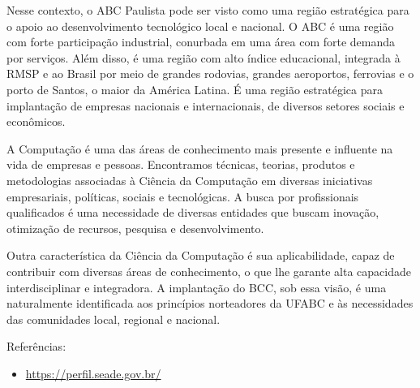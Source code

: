 Nesse contexto, o ABC Paulista pode ser visto como uma região estratégica para
o apoio ao desenvolvimento tecnológico local e nacional.
O ABC é uma região com forte participação industrial, conurbada em uma área com
forte demanda por serviços.
Além disso, é uma região com alto índice educacional, integrada à RMSP e ao
Brasil por meio de grandes rodovias, grandes aeroportos, ferrovias e o porto de
Santos, o maior da América Latina.
É uma região estratégica para implantação de empresas nacionais e
internacionais, de diversos setores sociais e econômicos.

A Computação é uma das áreas de conhecimento mais presente e influente na vida
de empresas e pessoas.
Encontramos técnicas, teorias, produtos e metodologias associadas à Ciência da
Computação em diversas iniciativas empresariais, políticas, sociais e
tecnológicas.
A busca por profissionais qualificados é uma necessidade de diversas entidades
que buscam inovação, otimização de recursos, pesquisa e desenvolvimento.

Outra característica da Ciência da Computação é sua aplicabilidade, capaz de
contribuir com diversas áreas de conhecimento, o que lhe garante alta
capacidade interdisciplinar e integradora.
A implantação do BCC, sob essa visão, é uma naturalmente identificada aos
princípios norteadores da UFABC e às necessidades das comunidades local,
regional e nacional.


Referências:
\begin{itemize}
    \item \url{https://perfil.seade.gov.br/}
\end{itemize}
